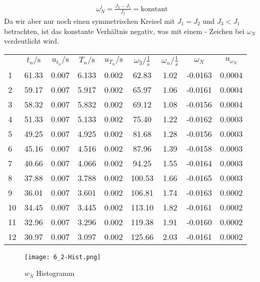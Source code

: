 \begin{align}
    \omega_N^i = \frac{J_3 - J_1}{J_1} = \text{konstant}
\end{align}
Da wir aber nur noch einen symmetrischen Kreisel mit $J_1 = J_2$ und $J_3<J_1$ betrachten, ist das konstante Verhältnis negativ, was mit einem - Zeichen bei $\omega_N$ verdeutlicht wird. 
\newpage
\begin{center}
    \begin{tabular}{gcccccccc}
         &     $t_n/\text{s}$ &   $u_{t_n}/\text{s}$ &     $T_n/\text{s}$ &   $u_{T_n}/\text{s}$ &      $\omega_3/\frac{1}{\text{s}}$ &    $\omega_n/\frac{1}{\text{s}}$ &      $\omega_N$ &    $u_{\omega_N}$ \\
        1  &  61.33 &  0.007 &  6.133 &  0.002 &   62.83 &  1.02 & -0.0163 &  0.0004 \\
        2  &  59.17 &  0.007 &  5.917 &  0.002 &   65.97 &  1.06 & -0.0161 &  0.0004 \\
        3  &  58.32 &  0.007 &  5.832 &  0.002 &   69.12 &  1.08 & -0.0156 &  0.0004 \\
        4  &  51.33 &  0.007 &  5.133 &  0.002 &   75.40 &  1.22 & -0.0162 &  0.0003 \\
        5  &  49.25 &  0.007 &  4.925 &  0.002 &   81.68 &  1.28 & -0.0156 &  0.0003 \\
        6  &  45.16 &  0.007 &  4.516 &  0.002 &   87.96 &  1.39 & -0.0158 &  0.0003 \\
        7  &  40.66 &  0.007 &  4.066 &  0.002 &   94.25 &  1.55 & -0.0164 &  0.0003 \\
        8  &  37.88 &  0.007 &  3.788 &  0.002 &  100.53 &  1.66 & -0.0165 &  0.0003 \\
        9  &  36.01 &  0.007 &  3.601 &  0.002 &  106.81 &  1.74 & -0.0163 &  0.0002 \\
        10 &  34.45 &  0.007 &  3.445 &  0.002 &  113.10 &  1.82 & -0.0161 &  0.0002 \\
        11 &  32.96 &  0.007 &  3.296 &  0.002 &  119.38 &  1.91 & -0.0160 &  0.0002 \\
        12 &  30.97 &  0.007 &  3.097 &  0.002 &  125.66 &  2.03 & -0.0161 &  0.0002 \\
    \end{tabular}
\end{center}
\begin{figure}[ht]
    \centering
    \caption{$w_N$ Histogramm}
    \texttt{[image: 6\_2-Hist.png]}
\end{figure}
